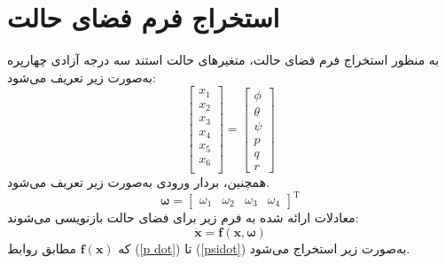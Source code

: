\section{استخراج فرم فضای حالت}\label{spacestate}
به منظور استخراج فرم فضای حالت، متغیرهای حالت استند سه درجه آزادی چهارپره به‌صورت زیر تعریف می‌شود:
\begin{equation}
	\begin{bmatrix}
		x_1\\x_2\\x_3\\x_4\\x_5\\x_6\\
	\end{bmatrix} = 
\begin{bmatrix}
	\phi\\ \theta \\ \psi \\ p\\ q\\ r
\end{bmatrix}
\end{equation}
همچنین، بردار ورودی به‌صورت زیر تعریف می‌شود.
\begin{equation}
	\boldsymbol{\omega} = \begin{bmatrix}
		\omega_1&\omega_2&\omega_3&\omega_4
	\end{bmatrix}^\mathrm{T}
\end{equation}
معادلات ارائه شده به فرم زیر برای فضای حالت بازنویسی می‌شوند:
\begin{equation}
	\boldsymbol{\dot x} = \boldsymbol f(\boldsymbol x, \boldsymbol{\omega})
\end{equation}
که $\boldsymbol f(\boldsymbol x)$ مطابق روابط
(\ref{p dot})
تا
(\ref{psidot})
به‌صورت زیر استخراج می‌شود.
